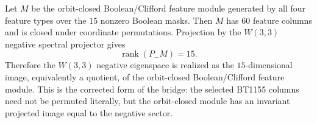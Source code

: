 \makeatletter
{}
\makeatother

\begin{theorem}
\label{thm:projected-boolean-quotient-module}
Let $M$ be the orbit-closed Boolean/Clifford feature module generated by all four
feature types over the $15$ nonzero Boolean masks.  Then $M$ has $60$ feature
columns and is closed under coordinate permutations.  Projection by the $W(3,3)$
negative spectral projector gives
\[
  \operatorname{rank}(P_-M)=15.
\]
Therefore the $W(3,3)$ negative eigenspace is realized as the $15$-dimensional
image, equivalently a quotient, of the orbit-closed Boolean/Clifford feature
module.  This is the corrected form of the bridge: the selected BT1155 columns
need not be permuted literally, but the orbit-closed module has an invariant
projected image equal to the negative sector.
\end{theorem}
